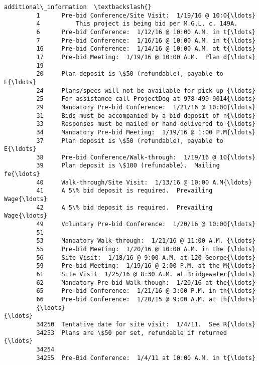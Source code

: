 \documentclass[11pt]{article}
\begin{document}
\begin{Verbatim}[commandchars=\\\{\}]
                                           additional\_information  \textbackslash{}
         1      Pre-bid Conference/Site Visit:  1/19/16 @ 10:0{\ldots}   
         4          This project is being bid per M.G.L. c. 149A.   
         6      Pre-bid Conference:  1/12/16 @ 10:00 A.M. in t{\ldots}   
         7      Pre-bid Conference:  1/16/16 @ 10:00 A.M. in t{\ldots}   
         16     Pre-bid Conference:  1/14/16 @ 10:00 A.M. at t{\ldots}   
         17     Pre-bid Meeting:  1/19/16 @ 10:00 A.M.  Plan d{\ldots}   
         19                                                         
         20     Plan deposit is \$50 (refundable), payable to E{\ldots}   
         24     Plans/specs will not be available for pick-up {\ldots}   
         25     For assistance call ProjectDog at 978-499-9014{\ldots}   
         29     Mandatory Pre-bid Conference:  1/21/16 @ 10:00{\ldots}   
         31     Bids must be accompanied by a bid deposit of n{\ldots}   
         33     Responses must be mailed or hand-delivered to {\ldots}   
         34     Mandatory Pre-bid Meeting:  1/19/16 @ 1:00 P.M{\ldots}   
         37     Plan deposit is \$50 (refundable), payable to E{\ldots}   
         38     Pre-bid Conference/Walk-through:  1/19/16 @ 10{\ldots}   
         39     Plan deposit is \$100 (refundable).  Mailing fe{\ldots}   
         40     Walk-through/Site Visit:  1/13/16 @ 10:00 A.M{\ldots}   
         41     A 5\% bid deposit is required.  Prevailing Wage{\ldots}   
         42     A 5\% bid deposit is required.  Prevailing Wage{\ldots}   
         49     Voluntary Pre-bid Conference:  1/20/16 @ 10:00{\ldots}   
         51                                                         
         53     Mandatory Walk-through:  1/21/16 @ 11:00 A.M. {\ldots}   
         55     Pre-bid Meeting:  1/20/16 @ 10:00 A.M. in the {\ldots}   
         56     Site Visit:  1/18/16 @ 9:00 A.M. at 120 George{\ldots}   
         59     Pre-bid Meeting:  1/19/16 @ 2:00 P.M. at the M{\ldots}   
         61     Site Visit  1/25/16 @ 8:30 A.M. at Bridgewater{\ldots}   
         62     Mandatory Pre-bid Walk-though:  1/20/16 at the{\ldots}   
         65     Pre-bid Conference:  1/21/16 @ 3:00 P.M. in th{\ldots}   
         66     Pre-bid Conference:  1/20/15 @ 9:00 A.M. at th{\ldots}   
         {\ldots}                                                  {\ldots}   
         34250  Tentative date for site visit:  1/4/11.  See R{\ldots}   
         34253  Plans are \$50 per set, refundable if returned {\ldots}   
         34254                                                      
         34255  Pre-Bid Conference:  1/4/11 at 10:00 A.M. in t{\ldots}   

\end{Verbatim}
\end{document}
